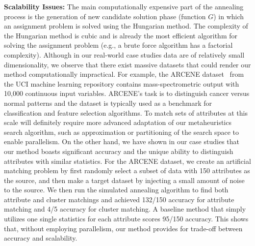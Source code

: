 \textbf{Scalability Issues:}
The main computationally expensive part of the annealing process is the generation of new candidate solution phase (function $G$) in which an assignment problem is solved using the Hungarian method. The complexity of the Hungarian method is cubic and is already the most efficient algorithm for solving the assignment problem (e.g., a brute force algorithm has a factorial complexity). Although in our real-world case studies data are of relatively small dimensionality, we observe that there exist massive datasets that could render our method computationally impractical. For example, the ARCENE dataset~\cite{ARCENE} from the UCI machine learning repository contains mass-spectrometric output with 10,000 continuous input variables. ARCENE's task is to distinguish cancer versus normal patterns and the dataset is typically used as a benchmark for classification and feature selection algorithms. To match sets of attributes at this scale will definitely require more advanced adaptation of our metaheuristics search algorithm, such as approximation or partitioning of the search space to enable parallelism. On the other hand, we have shown in our case studies that our method boasts significant accuracy and the unique ability to distinguish attributes with similar statistics.  For the ARCENE dataset, we create an artificial matching problem by first randomly select a subset of data with 150 attributes as the source, and then make a target dataset by injecting a small amount of noise to the source. We then run the simulated annealing algorithm to find both attribute and cluster matchings and achieved 132/150 accuracy for attribute matching and 4/5 accuracy for cluster matching. A baseline method that simply utilizes one single statistics for each attribute scores 95/150 accuracy. This shows that, without employing parallelism, our method provides for trade-off between accuracy and scalability.

